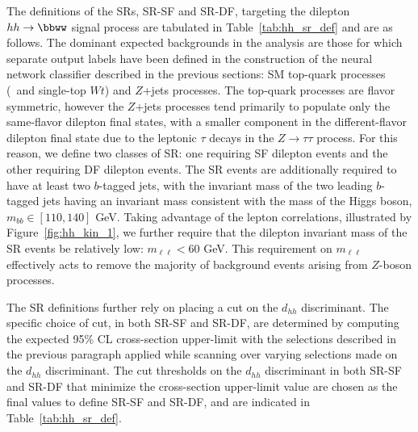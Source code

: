 The definitions of the SRs, SR-SF and SR-DF, targeting the dilepton $hh \rightarrow \bbww$ signal process are tabulated
in Table~\ref{tab:hh_sr_def} and are as follows.
The dominant expected backgrounds in the analysis are those for which separate output labels
have been defined in the construction of the neural network classifier described in the previous sections:
SM top-quark processes (\ttbar~and single-top $Wt$) and $Z$+jets processes.
The top-quark processes are flavor symmetric, however the $Z$+jets processes tend primarily to populate
only the same-flavor dilepton final states, with a smaller component in the different-flavor dilepton
final state due to the leptonic $\tau$ decays in the $Z\rightarrow \tau \tau$ process.
For this reason, we define two classes of SR: one requiring SF dilepton events and the
other requiring DF dilepton events.
The SR events are additionally required to have at least two $b$-tagged jets, with
the invariant mass of the two leading $b$-tagged jets having an invariant mass consistent with the
mass of the Higgs boson, $m_{bb} \in [110, 140]$ GeV.
Taking advantage of the lepton correlations, illustrated by Figure~\ref{fig:hh_kin_1},
we further require that the dilepton invariant mass of the SR events be relatively low: $m_{\ell \ell} < 60$ GeV.
This requirement on $m_{\ell \ell}$ effectively acts to remove the majority of background events
arising from $Z$-boson processes.

The SR definitions further rely on placing a cut on the $d_{hh}$ discriminant.
The specific choice of cut, in both SR-SF and SR-DF, are determined by computing the expected 95\% CL cross-section upper-limit
with the selections described in the previous paragraph applied while scanning over varying selections
made on the $d_{hh}$ discriminant.
The cut thresholds on the $d_{hh}$ discriminant in both SR-SF and SR-DF that minimize the cross-section
upper-limit value are chosen as the final values to define SR-SF and SR-DF, and are indicated in Table~\ref{tab:hh_sr_def}.



